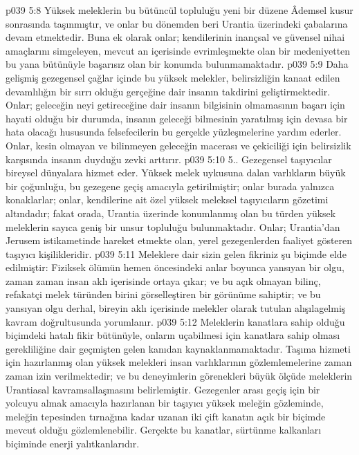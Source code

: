 \vs p039 5:8 Yüksek meleklerin bu bütüncül topluluğu yeni bir düzene Âdemsel kusur sonrasında taşınmıştır, ve onlar bu dönemden beri Urantia üzerindeki çabalarına devam etmektedir. Buna ek olarak onlar; kendilerinin inançsal ve güvensel nihai amaçlarını simgeleyen, mevcut an içerisinde evrimleşmekte olan bir medeniyetten bu yana bütünüyle başarısız olan bir konumda bulunmamaktadır.
\vs p039 5:9 Daha gelişmiş gezegensel çağlar içinde bu yüksek melekler, belirsizliğin kanaat edilen devamlılığın bir sırrı olduğu gerçeğine dair insanın takdirini geliştirmektedir. Onlar; geleceğin neyi getireceğine dair insanın bilgisinin olmamasının başarı için hayati olduğu bir durumda, insanın geleceği bilmesinin yaratılmış için devasa bir hata olacağı hususunda felsefecilerin bu gerçekle yüzleşmelerine yardım ederler. Onlar, kesin olmayan ve bilinmeyen geleceğin macerası ve çekiciliği için belirsizlik karşısında insanın duyduğu zevki arttırır.
\vs p039 5:10 5.\bibnobreakspace {}. Gezegensel taşıyıcılar bireysel dünyalara hizmet eder. Yüksek melek uykusuna dalan varlıkların büyük bir çoğunluğu, bu gezegene geçiş amacıyla getirilmiştir; onlar burada yalnızca konaklarlar; onlar, kendilerine ait özel yüksek meleksel taşıyıcıların gözetimi altındadır; fakat orada, Urantia üzerinde konumlanmış olan bu türden yüksek meleklerin sayıca geniş bir unsur topluluğu bulunmaktadır. Onlar; Urantia’dan Jerusem istikametinde hareket etmekte olan, yerel gezegenlerden faaliyet gösteren taşıyıcı kişilikleridir.
\vs p039 5:11 Meleklere dair sizin gelen fikriniz şu biçimde elde edilmiştir: Fiziksek ölümün hemen öncesindeki anlar boyunca yansıyan bir olgu, zaman zaman insan aklı içerisinde ortaya çıkar; ve bu açık olmayan bilinç, refakatçi melek türünden birini görselleştiren bir görünüme sahiptir; ve bu yansıyan olgu derhal, bireyin aklı içerisinde melekler olarak tutulan alışılagelmiş kavram doğrultusunda yorumlanır.
\vs p039 5:12 Meleklerin kanatlara sahip olduğu biçimdeki hatalı fikir bütünüyle, onların uçabilmesi için kanatlara sahip olması gerekliliğine dair geçmişten gelen kanıdan kaynaklanmamaktadır. Taşıma hizmeti için hazırlanmış olan yüksek melekleri insan varlıklarının gözlemlemelerine zaman zaman izin verilmektedir; ve bu deneyimlerin görenekleri büyük ölçüde meleklerin Urantiasal kavramsallaşmasını belirlemiştir. Gezegenler arası geçiş için bir yolcuyu almak amacıyla hazırlanan bir taşıyıcı yüksek meleğin gözleminde, meleğin tepesinden tırnağına kadar uzanan iki çift kanatın açık bir biçimde mevcut olduğu gözlemlenebilir. Gerçekte bu kanatlar, sürtünme kalkanları biçiminde enerji yalıtkanlarıdır.
